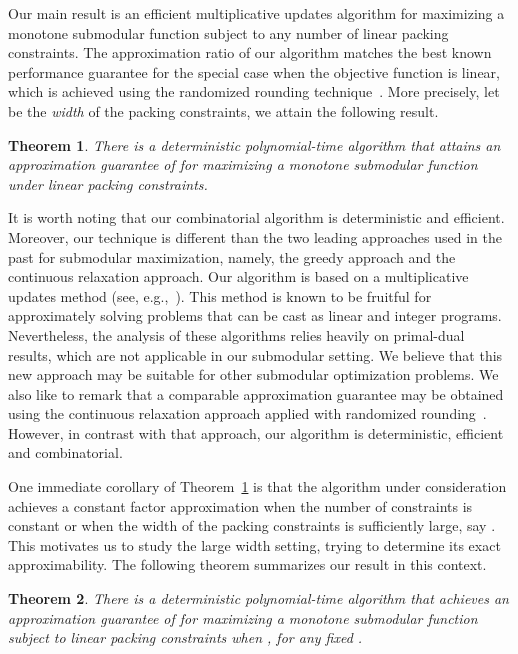 \documentclass[11pt]{article}
\theoremstyle{plain}
\newtheorem{theorem}{Theorem}[section]
\theoremstyle{definition}
\begin{document}
\medskip {}
Our main result is an efficient multiplicative updates algorithm
for maximizing a monotone submodular function subject to any
number of linear packing constraints. The approximation ratio of
our algorithm matches the best known performance guarantee for the
special case when the objective function  is linear, which is
achieved using the randomized rounding
technique~\cite{RaghavanT87,Raghavan88,Srinivasan99}. More
precisely, let  be the
\emph{width} of the packing constraints, we attain the following
result.

\begin{theorem} \label{th:MainResult1}
There is a deterministic polynomial-time algorithm that attains an
approximation guarantee of  for maximizing a
monotone submodular function under linear packing constraints.
\end{theorem}

It is worth noting that our combinatorial algorithm is
deterministic and efficient. Moreover, our technique is different
than the two leading approaches used in the past for submodular
maximization, namely, the greedy approach and the continuous
relaxation approach. Our algorithm is based on a multiplicative
updates method (see,
e.g.,~\cite{PlotkinST95,Young95,GargK07,AzarR06,BriestKV05}). This
method is known to be fruitful for approximately solving problems
that can be cast as linear and integer programs. Nevertheless, the
analysis of these algorithms relies heavily on primal-dual
results, which are not applicable in our submodular setting. We
believe that this new approach may be suitable for other
submodular optimization problems. We also like to remark that a
comparable approximation guarantee may be obtained using the
continuous relaxation approach applied with randomized
rounding~\cite{ChekuriV10}. However, in contrast with that
approach, our algorithm is deterministic, efficient and
combinatorial.

One immediate corollary of Theorem~\ref{th:MainResult1} is that
the algorithm under consideration achieves a constant factor
approximation when the number of constraints is constant or when
the width of the packing constraints is sufficiently large, say . This motivates us to study the large width
setting, trying to determine its exact approximability. The
following theorem summarizes our result in this context.

\begin{theorem} \label{th:MainResult2}
There is a deterministic polynomial-time algorithm that achieves
an approximation guarantee of  for
maximizing a monotone submodular function subject to linear
packing constraints when , for any
fixed .
\end{theorem}
\end{document}
